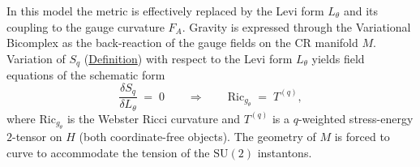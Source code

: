 \begin{remark}
  \label{rem:gr-substrate-geometry}
In this model the metric is effectively replaced by the Levi form
$L_\theta$ and its coupling to the gauge curvature $F_A$.  Gravity is
expressed through the Variational Bicomplex as the back-reaction of the
gauge fields on the CR manifold $M$.
Variation of $S_q$ (\hyperref[def:q-yang-mills-levi]{Definition}) with respect
to the Levi form $L_\theta$ yields field equations of the schematic form
\[
\frac{\delta S_q}{\delta L_\theta}
  \;=\; 0
  \qquad\Longrightarrow\qquad
  \mathrm{Ric}_{g_\theta} \;=\; T^{(q)},
\]
where $\mathrm{Ric}_{g_\theta}$ is the Webster Ricci curvature and
$T^{(q)}$ is a $q$-weighted stress-energy $2$-tensor on $H$ (both
coordinate-free objects).  The geometry of $M$ is forced to curve to accommodate the tension of the
$\mathrm{SU}(2)$ instantons.
\end{remark}

